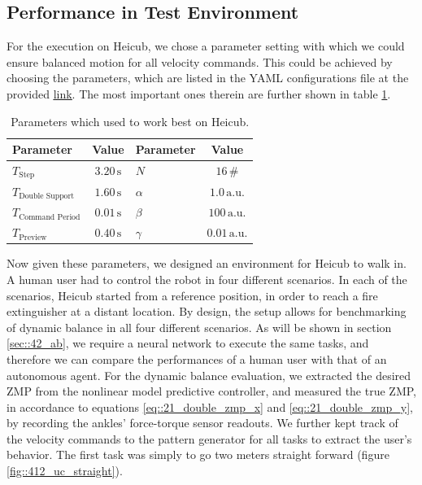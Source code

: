 \subsection{Performance in Test Environment}
\label{sec::412_pt}
For the execution on Heicub, we chose a parameter setting with which we could ensure balanced motion for all velocity commands. This could be achieved by choosing the parameters, which are listed in the YAML configurations file at the provided \href{https://github.com/mhubii/nmpc_pattern_generator/blob/719fde0bb73925923de85cbf379c5523e075dfeb/libs/pattern_generator/configs.yaml#L1}{\underline{link}}. The most important ones therein are further shown in table \ref{tab::412_params}.
\begin{table}
	\centering
	\caption{Parameters which used to work best on Heicub.}
	\begin{tabular}{lclc}
		Parameter&Value&Parameter&Value\\
		\hline
		$T_{\text{Step}}$ & $3.20\,\text{s}$ & $N$ & $16\,\text{\#}$ \\
		$T_{\text{Double Support}}$ & $1.60\,\text{s}$ & $\alpha$ & $1.0\,\text{a.u.}$ \\
		$T_{\text{Command Period}}$  & $0.01\,\text{s}$& $\beta$ & $100\,\text{a.u.}$ \\
		$T_{\text{Preview}}$ & $0.40\,\text{s}$ & $\gamma$ & $0.01\,\text{a.u.}$
	\end{tabular}
	\label{tab::412_params}
\end{table}
Now given these parameters, we designed an environment for Heicub to walk in. A human user had to control the robot in four different scenarios. In each of the scenarios, Heicub started from a reference position, in order to reach a fire extinguisher at a distant location. By design, the setup allows for benchmarking of dynamic balance in all four different scenarios. As will be shown in section \ref{sec::42_ab}, we require a neural network to execute the same tasks, and therefore we can compare the performances of a human user with that of an autonomous agent. For the dynamic balance evaluation, we extracted the desired ZMP from the nonlinear model predictive controller, and measured the true ZMP, in accordance to equations \ref{eq::21_double_zmp_x} and \ref{eq::21_double_zmp_y}, by recording the ankles' force-torque sensor readouts. We further kept track of the velocity commands to the pattern generator for all tasks to extract the user's behavior. The first task was simply to go two meters straight forward (figure \ref{fig::412_uc_straight}).

